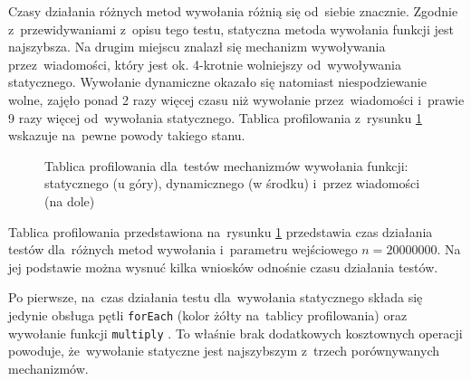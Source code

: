 \documentclass[mgr, shortabstract]{iithesis}
\newcommand{\swiftinline}[1]{
    \texttt{#1}
}
\begin{document}
Czasy działania różnych metod wywołania różnią się od~siebie znacznie. Zgodnie z~przewidywaniami z~opisu tego testu, statyczna metoda wywołania funkcji jest najszybsza. Na drugim miejscu znalazł się mechanizm wywoływania przez~wiadomości, który jest ok. 4-krotnie wolniejszy od~wywoływania statycznego. Wywołanie dynamiczne okazało się natomiast niespodziewanie wolne, zajęło ponad 2 razy więcej czasu niż wywołanie przez~wiadomości i~prawie 9 razy więcej od~wywołania statycznego. Tablica profilowania z~rysunku \ref{i:dispatch_method} wskazuje na~pewne powody takiego stanu.

\begin{figure}
    \caption{Tablica profilowania dla~testów mechanizmów wywołania funkcji: statycznego (u góry), dynamicznego (w środku) i~przez wiadomości (na dole)}
    \label{i:dispatch_method}
\end{figure}

Tablica profilowania przedstawiona na~rysunku \ref{i:dispatch_method} przedstawia czas działania testów dla~różnych metod wywołania i~parametru wejściowego $n = 20000000$. Na jej podstawie można wysnuć kilka wniosków odnośnie czasu działania testów.

Po pierwsze, na~czas działania testu dla~wywołania statycznego składa się jedynie obsługa pętli \swiftinline{forEach} (kolor żółty na~tablicy profilowania) oraz wywołanie funkcji \swiftinline{multiply}. To właśnie brak dodatkowych kosztownych operacji powoduje, że~wywołanie statyczne jest najszybszym z~trzech porównywanych mechanizmów.
\end{document}
